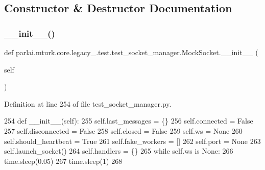 \subsection{Constructor \& Destructor Documentation}
\mbox{\label{classparlai_1_1mturk_1_1core_1_1legacy__2018_1_1test_1_1test__socket__manager_1_1MockSocket_a1b95f4ed880e7137acd5ed6b03ae3f09}} 
\subsubsection{\texorpdfstring{\+\_\+\+\_\+init\+\_\+\+\_\+()}{\_\_init\_\_()}}
{\footnotesize\ttfamily def parlai.\+mturk.\+core.\+legacy\+\_.\+test.\+test\+\_\+socket\+\_\+manager.\+Mock\+Socket.\+\_\+\+\_\+init\+\_\+\+\_\+ (\begin{DoxyParamCaption}\item[{}]{self }\end{DoxyParamCaption})}



Definition at line 254 of file test\+\_\+socket\+\_\+manager.\+py.


\begin{DoxyCode}
254     \textcolor{keyword}{def }\_\_init\_\_(self):
255         self.last\_messages = \{\}
256         self.connected = \textcolor{keyword}{False}
257         self.disconnected = \textcolor{keyword}{False}
258         self.closed = \textcolor{keyword}{False}
259         self.ws = \textcolor{keywordtype}{None}
260         self.should\_heartbeat = \textcolor{keyword}{True}
261         self.fake\_workers = []
262         self.port = \textcolor{keywordtype}{None}
263         self.launch\_socket()
264         self.handlers = \{\}
265         \textcolor{keywordflow}{while} self.ws \textcolor{keywordflow}{is} \textcolor{keywordtype}{None}:
266             time.sleep(0.05)
267         time.sleep(1)
268 
\end{DoxyCode}


